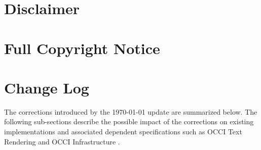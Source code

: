 \documentclass[10pt,a4paper]{article}
\begin{document}
\section{Disclaimer}


\section{Full Copyright Notice}





\appendix

\newpage
\section{Change Log}
\label{sec:change_log}

The corrections introduced by the {\today} update are summarized below.
The following sub-sections describe the possible impact of the corrections
on existing implementations and associated dependent specifications such
as OCCI Text Rendering \cite{occi:text} and OCCI Infrastructure
\cite{occi:infrastructure}.
\end{document}
